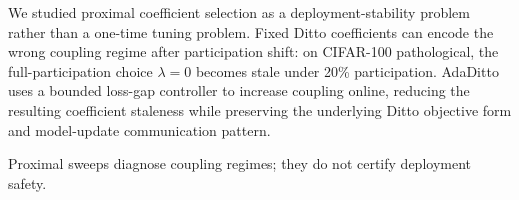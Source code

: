 \documentclass[letterpaper]{article} %
\begin{document}
We studied proximal coefficient selection as a deployment-stability
problem rather than a one-time tuning problem. Fixed Ditto
coefficients can encode the wrong coupling regime after
participation shift: on CIFAR-100 pathological, the
full-participation choice $\lambda=0$ becomes stale under 20\%
participation. AdaDitto uses a bounded loss-gap controller to
increase coupling online, reducing the resulting coefficient staleness
while preserving the underlying Ditto objective form and model-update
communication pattern.

Proximal sweeps diagnose coupling regimes; they do not certify
deployment safety.


% 
\end{document}
